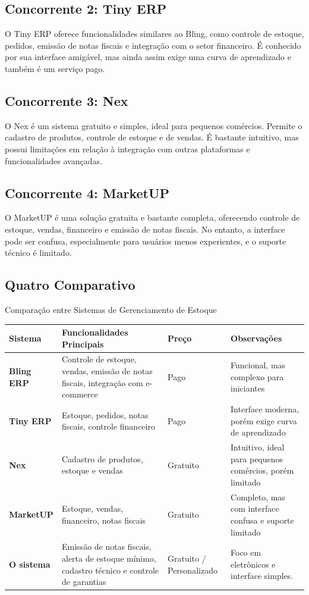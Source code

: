 \documentclass[
	12pt,				%
	openany,			%
	twoside,			%
	a4paper,			%
	english,			%
	brazil				%
	]{abntex2}
\begin{document}
\subsection{Concorrente 2: Tiny ERP}
O Tiny ERP oferece funcionalidades similares ao Bling, como controle de estoque, pedidos, emissão de notas fiscais e integração com o setor financeiro. É conhecido por sua interface amigável, mas ainda assim exige uma curva de aprendizado e também é um serviço pago.

\subsection{Concorrente 3: Nex}
O Nex é um sistema gratuito e simples, ideal para pequenos comércios. Permite o cadastro de produtos, controle de estoque e de vendas. É bastante intuitivo, mas possui limitações em relação à integração com outras plataformas e funcionalidades avançadas.

\subsection{Concorrente 4: MarketUP}
O MarketUP é uma solução gratuita e bastante completa, oferecendo controle de estoque, vendas, financeiro e emissão de notas fiscais. No entanto, a interface pode ser confusa, especialmente para usuários menos experientes, e o suporte técnico é limitado.

\subsection{Quatro Comparativo}

\begin{quadro}[htb]
\caption{\label{quadro_comparativo}Comparação entre Sistemas de Gerenciamento de Estoque}
\begin{tabular}{|p{3.2cm}|p{5.5cm}|p{2.2cm}|p{4.1cm}|}
\hline
\textbf{Sistema} & \textbf{Funcionalidades Principais} & \textbf{Preço} & \textbf{Observações} \\
\hline
\textbf{Bling ERP} & Controle de estoque, vendas, emissão de notas fiscais, integração com e-commerce & Pago & Funcional, mas complexo para iniciantes \\
\hline
\textbf{Tiny ERP} & Estoque, pedidos, notas fiscais, controle financeiro & Pago & Interface moderna, porém exige curva de aprendizado \\
\hline
\textbf{Nex} & Cadastro de produtos, estoque e vendas & Gratuito & Intuitivo, ideal para pequenos comércios, porém limitado \\
\hline
\textbf{MarketUP} & Estoque, vendas, financeiro, notas fiscais & Gratuito & Completo, mas com interface confusa e suporte limitado \\
\hline
\textbf{O sistema} & Emissão de notas fiscais, alerta de estoque mínimo, cadastro técnico e controle de garantias & Gratuito / Personalizado & Foco em eletrônicos e interface simples. \\
\hline
\end{tabular}
\end{quadro}
\end{document}
